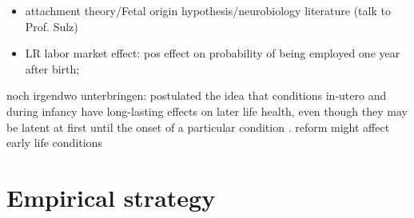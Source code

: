 \documentclass[11pt, a4paper]{article} %
\begin{document}










\begin{itemize}
	\item attachment theory/Fetal origin hypothesis/neurobiology literature (talk to Prof. Sulz)

	\item LR labor market effect: pos effect on probability of being employed one year after birth; \cite{albagli2018}
\end{itemize} 
noch irgendwo unterbringen: 
\cite{Barker1990origins} postulated the idea that conditions in-utero and during infancy have long-lasting effects on later life health, even though they may be latent at first until the onset of a particular condition \citep{almond2011fetalorigins}. reform might affect early life conditions 


\newpage
\section{Empirical strategy}\label{sec:empirical_strategy}
\end{document}
